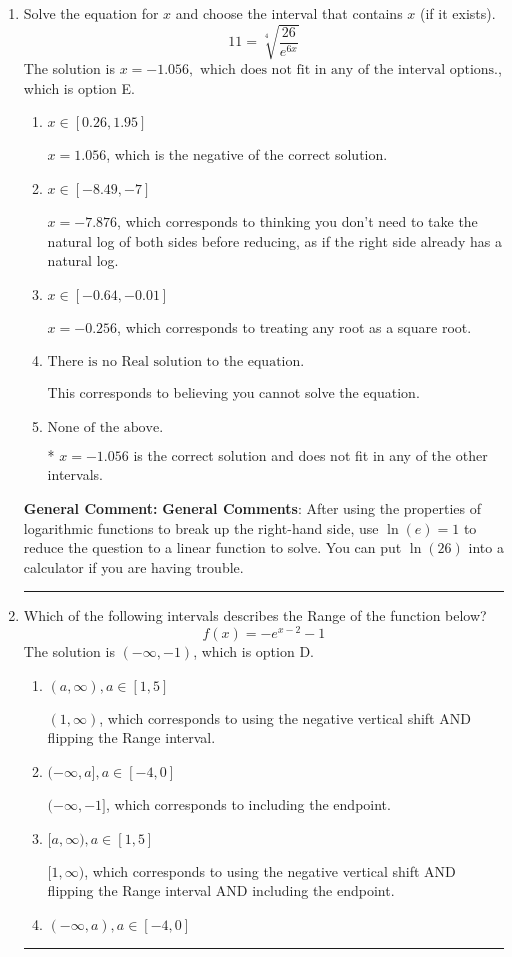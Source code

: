 \documentclass{extbook}[14pt]
\newcommand{\litem}[1]{\item #1

\rule{\textwidth}{0.4pt}}
\begin{document}
\begin{enumerate}\litem{
 Solve the equation for $x$ and choose the interval that contains $x$ (if it exists).
\[  11 = \sqrt[4]{\frac{26}{e^{6x}}} \]The solution is \( x = -1.056, \text{ which does not fit in any of the interval options.} \), which is option E.\begin{enumerate}[label=\Alph*.]
\item \( x \in [0.26, 1.95] \)

$x = 1.056$, which is the negative of the correct solution.
\item \( x \in [-8.49, -7] \)

$x = -7.876$, which corresponds to thinking you don't need to take the natural log of both sides before reducing, as if the right side already has a natural log.
\item \( x \in [-0.64, -0.01] \)

$x = -0.256$, which corresponds to treating any root as a square root.
\item \( \text{There is no Real solution to the equation.} \)

This corresponds to believing you cannot solve the equation.
\item \( \text{None of the above.} \)

* $x = -1.056$ is the correct solution and does not fit in any of the other intervals.
\end{enumerate}

\textbf{General Comment:} \textbf{General Comments}: After using the properties of logarithmic functions to break up the right-hand side, use $\ln(e) = 1$ to reduce the question to a linear function to solve. You can put $\ln(26)$ into a calculator if you are having trouble.
}
\litem{
Which of the following intervals describes the Range of the function below?
\[ f(x) = -e^{x-2}-1 \]The solution is \( (-\infty, -1) \), which is option D.\begin{enumerate}[label=\Alph*.]
\item \( (a, \infty), a \in [1, 5] \)

$(1, \infty)$, which corresponds to using the negative vertical shift AND flipping the Range interval.
\item \( (-\infty, a], a \in [-4, 0] \)

$(-\infty, -1]$, which corresponds to including the endpoint.
\item \( [a, \infty), a \in [1, 5] \)

$[1, \infty)$, which corresponds to using the negative vertical shift AND flipping the Range interval AND including the endpoint.
\item \( (-\infty, a), a \in [-4, 0] \)


\end{enumerate}}
\end{enumerate}
\end{document}
